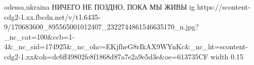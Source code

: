  
 
 
 
 

\par
odessa,ukraina
НИЧЕГО НЕ ПОЗДНО, ПОКА МЫ ЖИВЫ
\ifcmt
  ig https://scontent-cdg2-1.xx.fbcdn.net/v/t1.6435-9/170683600_895565001012407_2322744861546635170_n.jpg?_nc_cat=100&ccb=1-4&_nc_sid=174925&_nc_ohc=EKjfheG8rIkAX9WYnKc&_nc_ht=scontent-cdg2-1.xx&oh=dc6ff49802fe8f1868d87a7e2a9e5d3e&oe=613735CF
  width 0.15
\fi

